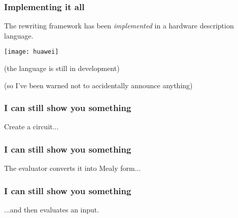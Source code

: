 \begin{frame}
    \frametitle{Implementing it all}

    \centering
    \Large

    The rewriting framework has been \emph{implemented} in a
    \alert{hardware description language}.

    \begin{center}
        \texttt{[image: huawei]}
    \end{center}

    \pause

    \small
    (the language is still in development)

    \pause

    \scriptsize
    (so I've been warned not to accidentally announce anything)

\end{frame}

\begin{frame}
    \frametitle{I can still show you something}

    Create a circuit...


\end{frame}
\begin{frame}
    \frametitle{I can still show you something}

    The evaluator converts it into \alert{Mealy form}...


\end{frame}
\begin{frame}
    \frametitle{I can still show you something}

    ...and then evaluates an input.


\end{frame}